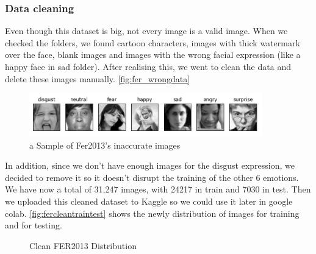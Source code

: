 \documentclass[12pt,a4paper,oneside,english]{book}
\begin{document}
\subsubsection{Data cleaning}
Even though this dataset is big, not every image is a valid image. When we checked the folders, we found cartoon characters, images with thick watermark over the face, blank images and images with the wrong facial expression (like a happy face in sad folder). After realising this, we went to clean the data and delete these images manually. \autoref{fig:fer_wrongdata}
\begin{figure}[H]
    \centering
    \includegraphics[width=0.9\textwidth]{figures/model/ferwrongdata.jpg}
    \caption{a Sample of Fer2013's inaccurate images}
    \label{fig:fer_wrongdata}
\end{figure}
\noindent
In addition, since we don't have enough images for the disgust expression, we decided to remove it so it doesn't disrupt the training of the other 6 emotions.
We have now a total of 31,247 images, with 24217 in train and 7030 in test. Then we uploaded this cleaned dataset to Kaggle so we could use it later in google colab.
\autoref{fig:fercleantraintest} shows the newly distribution of images for training and for testing.
\begin{figure}[H]
\begin{center}
\quad 
{}
\caption{Clean FER2013 Distribution}
\label{fig:fercleantraintest}
\end{center}
\end{figure}
\end{document}
